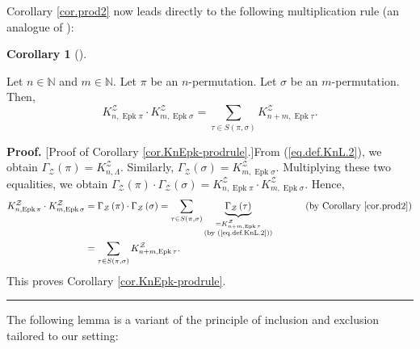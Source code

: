 \documentclass[numbers=enddot,12pt,final,onecolumn,notitlepage]{scrartcl}%
\theoremstyle{definition}
\newtheorem{coro}[theo]{Corollary}
\newenvironment{corollary}[1][]
{\begin{coro}[#1]\begin{leftbar}}
{\end{leftbar}\end{coro}}
\newenvironment{proof}[1][Proof]{\noindent\textbf{#1.} }{\ \rule{0.5em}{0.5em}}
\let\sumnonlimits\sum
\renewcommand{\sum}{\sumnonlimits\limits}
\begin{document}
Corollary \ref{cor.prod2} now leads directly to the following multiplication rule
(an analogue of \cite[(3.1)]{Stembr97}):

\begin{corollary}
\label{cor.KnEpk-prodrule}Let $n\in\mathbb{N}$ and $m\in\mathbb{N}$. Let $\pi$
be an $n$-permutation. Let $\sigma$ be an $m$-permutation. Then,%
\[
K_{n,\operatorname*{Epk}\pi}^{\mathcal{Z}}\cdot K_{m,\operatorname*{Epk}%
\sigma}^{\mathcal{Z}}=\sum_{\tau\in S\left(  \pi,\sigma\right)  }%
K_{n+m,\operatorname*{Epk}\tau}^{\mathcal{Z}}.
\]

\end{corollary}

\begin{proof}
[Proof of Corollary \ref{cor.KnEpk-prodrule}.]From (\ref{eq.def.KnL.2}), we
obtain $\Gamma_{\mathcal{Z}}\left(  \pi\right)  =K_{n,\Lambda}^{\mathcal{Z}}$.
Similarly, $\Gamma_{\mathcal{Z}}\left(  \sigma\right)
=K_{m,\operatorname*{Epk}\sigma}^{\mathcal{Z}}$. Multiplying these two
equalities, we obtain $\Gamma_{\mathcal{Z}}\left(  \pi\right)  \cdot
\Gamma_{\mathcal{Z}}\left(  \sigma\right)  =K_{n,\operatorname*{Epk}\pi
}^{\mathcal{Z}}\cdot K_{m,\operatorname*{Epk}\sigma}^{\mathcal{Z}}$. Hence,%
\begin{align*}
K_{n,\operatorname*{Epk}\pi}^{\mathcal{Z}}\cdot K_{m,\operatorname*{Epk}%
\sigma}^{\mathcal{Z}}  &  =\Gamma_{\mathcal{Z}}\left(  \pi\right)  \cdot
\Gamma_{\mathcal{Z}}\left(  \sigma\right)  =\sum_{\tau\in S\left(  \pi
,\sigma\right)  }\underbrace{\Gamma_{\mathcal{Z}}\left(  \tau\right)
}_{\substack{=K_{n+m,\operatorname*{Epk}\tau}^{\mathcal{Z}}\\\text{(by
(\ref{eq.def.KnL.2}))}}}\ \ \ \ \ \ \ \ \ \ \left(  \text{by Corollary
\ref{cor.prod2}}\right) \\
&  =\sum_{\tau\in S\left(  \pi,\sigma\right)  }K_{n+m,\operatorname*{Epk}\tau
}^{\mathcal{Z}}.
\end{align*}
This proves Corollary \ref{cor.KnEpk-prodrule}.
\end{proof}

The following lemma is a variant of the principle of inclusion and exclusion
tailored to our setting:
\end{document}
